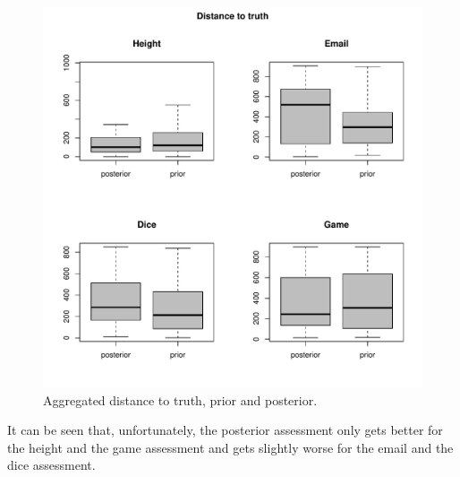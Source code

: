 \documentclass[oneside, 11pt]{book}
\begin{document}
\begin{figure}[h!]
\caption{Aggregated distance to truth, prior and posterior.}
\label{distance}
  \centering
    \includegraphics[scale=0.68]{valuedistance.pdf}
\end{figure}
It can be seen that, unfortunately, the posterior assessment only gets better for the height and the game assessment and gets slightly worse for the email and the dice assessment. 
\end{document}
